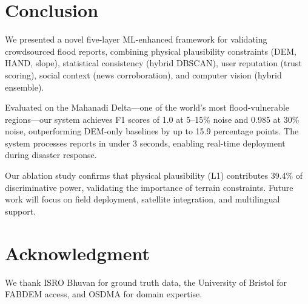 \documentclass[conference]{IEEEtran}
\begin{document}
\section{Conclusion}
\label{sec:conclusion}

We presented a novel five-layer ML-enhanced framework for validating crowdsourced flood reports, combining physical plausibility constraints (DEM, HAND, slope), statistical consistency (hybrid DBSCAN), user reputation (trust scoring), social context (news corroboration), and computer vision (hybrid ensemble).

Evaluated on the Mahanadi Delta---one of the world's most flood-vulnerable regions---our system achieves F1 scores of 1.0 at 5--15\% noise and 0.985 at 30\% noise, outperforming DEM-only baselines by up to 15.9 percentage points. The system processes reports in under 3 seconds, enabling real-time deployment during disaster response.

Our ablation study confirms that physical plausibility (L1) contributes 39.4\% of discriminative power, validating the importance of terrain constraints. Future work will focus on field deployment, satellite integration, and multilingual support.

\section*{Acknowledgment}
We thank ISRO Bhuvan for ground truth data, the University of Bristol for FABDEM access, and OSDMA for domain expertise.



\end{document}
